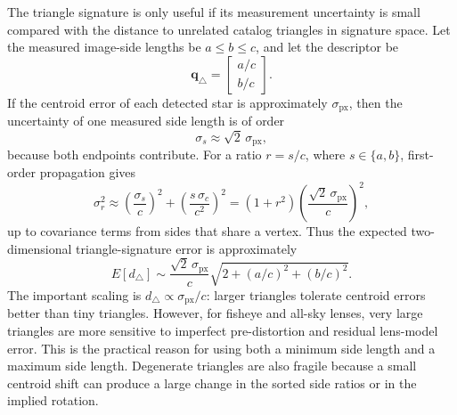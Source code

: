 \documentclass[11pt]{article}
\begin{document}
The triangle signature is only useful if its measurement uncertainty is small
compared with the distance to unrelated catalog triangles in signature space.
Let the measured image-side lengths be \(a\le b\le c\), and let the descriptor
be
\begin{equation}
  \mathbf{q}_{\triangle} =
  \begin{bmatrix}
    a/c\\
    b/c
  \end{bmatrix}.
\end{equation}
If the centroid error of each detected star is approximately
\(\sigma_{\mathrm{px}}\), then the uncertainty of one measured side length is
of order
\begin{equation}
  \sigma_s \approx \sqrt{2}\,\sigma_{\mathrm{px}},
\end{equation}
because both endpoints contribute. For a ratio \(r=s/c\), where
\(s\in\{a,b\}\), first-order propagation gives
\begin{equation}
  \sigma_r^2
  \approx
  \left(\frac{\sigma_s}{c}\right)^2
  +
  \left(\frac{s\,\sigma_c}{c^2}\right)^2
  =
  \left(1+r^2\right)
  \left(\frac{\sqrt{2}\,\sigma_{\mathrm{px}}}{c}\right)^2 ,
\end{equation}
up to covariance terms from sides that share a vertex. Thus the expected
two-dimensional triangle-signature error is approximately
\begin{equation}
  E[d_{\triangle}]
  \sim
  \frac{\sqrt{2}\,\sigma_{\mathrm{px}}}{c}
  \sqrt{2+\left(a/c\right)^2+\left(b/c\right)^2}.
\end{equation}
The important scaling is \(d_{\triangle}\propto\sigma_{\mathrm{px}}/c\):
larger triangles tolerate centroid errors better than tiny triangles. However,
for fisheye and all-sky lenses, very large triangles are more sensitive to
imperfect pre-distortion and residual lens-model error. This is the practical
reason for using both a minimum side length and a maximum side length.
Degenerate triangles are also fragile because a small centroid shift can
produce a large change in the sorted side ratios or in the implied rotation.
\end{document}
